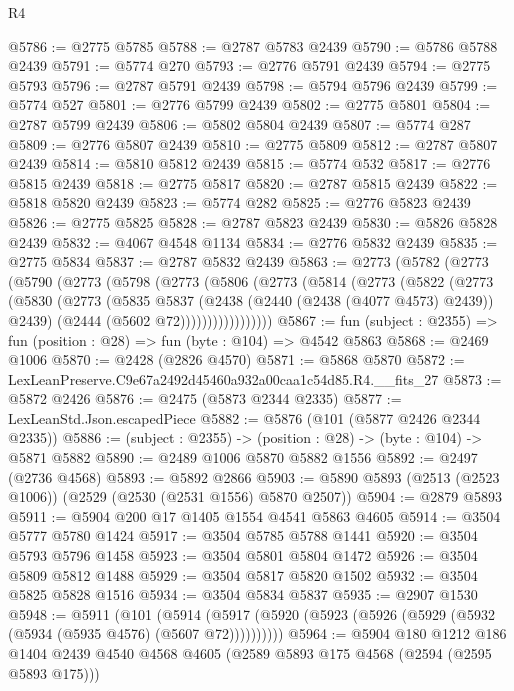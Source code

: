 \begin{lexlean}{R4}
\begin{coremodule}
@5786 := @2775 @5785
@5788 := @2787 @5783 @2439
@5790 := @5786 @5788 @2439
@5791 := @5774 @270
@5793 := @2776 @5791 @2439
@5794 := @2775 @5793
@5796 := @2787 @5791 @2439
@5798 := @5794 @5796 @2439
@5799 := @5774 @527
@5801 := @2776 @5799 @2439
@5802 := @2775 @5801
@5804 := @2787 @5799 @2439
@5806 := @5802 @5804 @2439
@5807 := @5774 @287
@5809 := @2776 @5807 @2439
@5810 := @2775 @5809
@5812 := @2787 @5807 @2439
@5814 := @5810 @5812 @2439
@5815 := @5774 @532
@5817 := @2776 @5815 @2439
@5818 := @2775 @5817
@5820 := @2787 @5815 @2439
@5822 := @5818 @5820 @2439
@5823 := @5774 @282
@5825 := @2776 @5823 @2439
@5826 := @2775 @5825
@5828 := @2787 @5823 @2439
@5830 := @5826 @5828 @2439
@5832 := @4067 @4548 @1134
@5834 := @2776 @5832 @2439
@5835 := @2775 @5834
@5837 := @2787 @5832 @2439
@5863 := @2773
    (@5782
      (@2773
        (@5790
          (@2773
            (@5798
              (@2773
                (@5806
                  (@2773
                    (@5814
                      (@2773
                        (@5822
                          (@2773
                            (@5830
                              (@2773
                                (@5835
                                  @5837
                                  (@2438 (@2440 (@2438 (@4077 @4573) @2439)) @2439)
                                  (@2444 (@5602 @72)))))))))))))))))
@5867 := fun (subject : @2355) => fun (position : @28) => fun (byte : @104) => @4542 @5863
@5868 := @2469 @1006
@5870 := @2428 (@2826 @4570)
@5871 := @5868 @5870
@5872 := LexLeanPreserve.C9e67a2492d45460a932a00caa1c54d85.R4.__fits_27
@5873 := @5872 @2426
@5876 := @2475 (@5873 @2344 @2335)
@5877 := LexLeanStd.Json.escapedPiece
@5882 := @5876 (@101 (@5877 @2426 @2344 @2335))
@5886 := (subject : @2355) -> (position : @28) -> (byte : @104) -> @5871 @5882
@5890 := @2489 @1006 @5870 @5882 @1556
@5892 := @2497 (@2736 @4568)
@5893 := @5892 @2866
@5903 := @5890 @5893 (@2513 (@2523 @1006)) (@2529 (@2530 (@2531 @1556) @5870 @2507))
@5904 := @2879 @5893
@5911 := @5904 @200 @17 @1405 @1554 @4541 @5863 @4605
@5914 := @3504 @5777 @5780 @1424
@5917 := @3504 @5785 @5788 @1441
@5920 := @3504 @5793 @5796 @1458
@5923 := @3504 @5801 @5804 @1472
@5926 := @3504 @5809 @5812 @1488
@5929 := @3504 @5817 @5820 @1502
@5932 := @3504 @5825 @5828 @1516
@5934 := @3504 @5834 @5837
@5935 := @2907 @1530
@5948 := @5911
    (@101 (@5914 (@5917 (@5920 (@5923 (@5926 (@5929 (@5932 (@5934 (@5935 @4576) (@5607 @72))))))))))
@5964 := @5904
    @180
    @1212
    @186
    @1404
    @2439
    @4540
    @4568
    @4605
    (@2589 @5893 @175 @4568 (@2594 (@2595 @5893 @175)))

\end{coremodule}
\end{lexlean}
